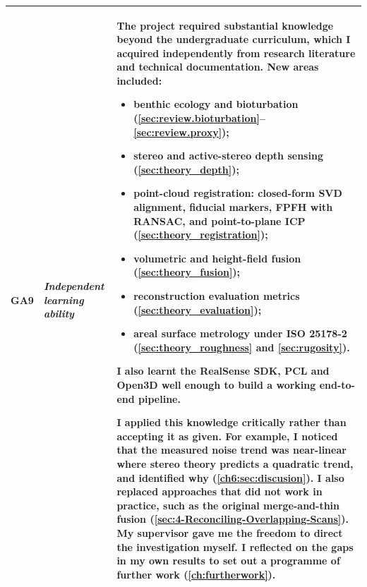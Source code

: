 {\begin{longtable}{>{\raggedright\arraybackslash}p{} >{\raggedright\arraybackslash}p{} >{\noindent\justifying\arraybackslash}p{}}
		GA9 & \textit{Independent learning ability} &
		The project required substantial knowledge beyond the undergraduate curriculum, which I acquired independently from research literature and technical documentation. New areas included:
		\begin{itemize}
			\item benthic ecology and bioturbation (\autoref{sec:review.bioturbation}--\autoref{sec:review.proxy});
			\item stereo and active-stereo depth sensing (\autoref{sec:theory_depth});
			\item point-cloud registration: closed-form SVD alignment, fiducial markers, FPFH with RANSAC, and point-to-plane ICP (\autoref{sec:theory_registration});
			\item volumetric and height-field fusion (\autoref{sec:theory_fusion});
			\item reconstruction evaluation metrics (\autoref{sec:theory_evaluation});
			\item areal surface metrology under ISO 25178-2 (\autoref{sec:theory_roughness} and \autoref{sec:rugosity}).
		\end{itemize}
		I also learnt the RealSense SDK, PCL and Open3D well enough to build a working end-to-end pipeline.
		
		I applied this knowledge critically rather than accepting it as given. For example, I noticed that the measured noise trend was near-linear where stereo theory predicts a quadratic trend, and identified why (\autoref{ch6:sec:discusion}). I also replaced approaches that did not work in practice, such as the original merge-and-thin fusion (\autoref{sec:4-Reconciling-Overlapping-Scans}). My supervisor gave me the freedom to direct the investigation myself. I reflected on the gaps in my own results to set out a programme of further work (\autoref{ch:furtherwork}). \\
		\bottomrule
	\end{longtable}
}